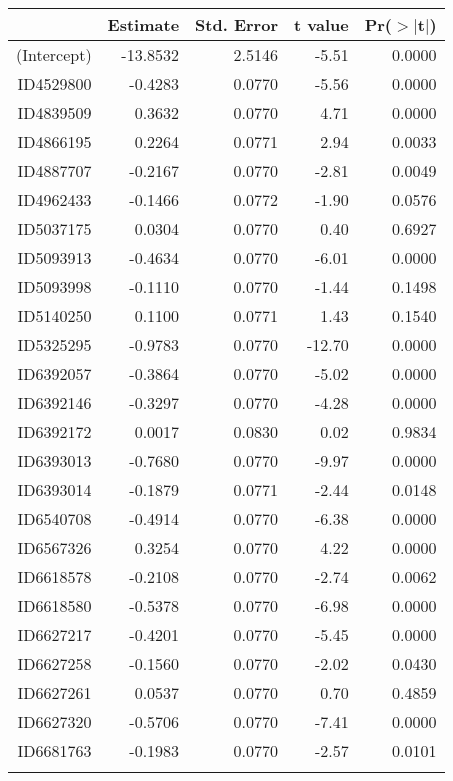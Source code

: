 \begin{table}[ht]
\centering
\begin{tabular}{rrrrr}
  \hline
 & Estimate & Std. Error & t value & Pr($>$$|$t$|$) \\ 
  \hline
(Intercept) & -13.8532 & 2.5146 & -5.51 & 0.0000 \\ 
  ID4529800 & -0.4283 & 0.0770 & -5.56 & 0.0000 \\ 
  ID4839509 & 0.3632 & 0.0770 & 4.71 & 0.0000 \\ 
  ID4866195 & 0.2264 & 0.0771 & 2.94 & 0.0033 \\ 
  ID4887707 & -0.2167 & 0.0770 & -2.81 & 0.0049 \\ 
  ID4962433 & -0.1466 & 0.0772 & -1.90 & 0.0576 \\ 
  ID5037175 & 0.0304 & 0.0770 & 0.40 & 0.6927 \\ 
  ID5093913 & -0.4634 & 0.0770 & -6.01 & 0.0000 \\ 
  ID5093998 & -0.1110 & 0.0770 & -1.44 & 0.1498 \\ 
  ID5140250 & 0.1100 & 0.0771 & 1.43 & 0.1540 \\ 
  ID5325295 & -0.9783 & 0.0770 & -12.70 & 0.0000 \\ 
  ID6392057 & -0.3864 & 0.0770 & -5.02 & 0.0000 \\ 
  ID6392146 & -0.3297 & 0.0770 & -4.28 & 0.0000 \\ 
  ID6392172 & 0.0017 & 0.0830 & 0.02 & 0.9834 \\ 
  ID6393013 & -0.7680 & 0.0770 & -9.97 & 0.0000 \\ 
  ID6393014 & -0.1879 & 0.0771 & -2.44 & 0.0148 \\ 
  ID6540708 & -0.4914 & 0.0770 & -6.38 & 0.0000 \\ 
  ID6567326 & 0.3254 & 0.0770 & 4.22 & 0.0000 \\ 
  ID6618578 & -0.2108 & 0.0770 & -2.74 & 0.0062 \\ 
  ID6618580 & -0.5378 & 0.0770 & -6.98 & 0.0000 \\ 
  ID6627217 & -0.4201 & 0.0770 & -5.45 & 0.0000 \\ 
  ID6627258 & -0.1560 & 0.0770 & -2.02 & 0.0430 \\ 
  ID6627261 & 0.0537 & 0.0770 & 0.70 & 0.4859 \\ 
  ID6627320 & -0.5706 & 0.0770 & -7.41 & 0.0000 \\ 
  ID6681763 & -0.1983 & 0.0770 & -2.57 & 0.0101 \\ 
$$
\end{tabular}
\end{table}
